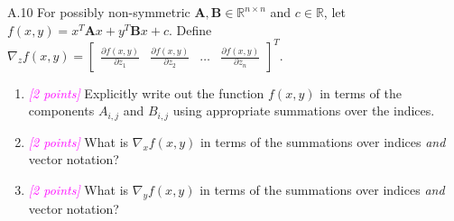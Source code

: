 \documentclass{article}
\newcommand{\field}[1]{\mathbb{#1}}
\newcommand{\1}{\mathbf{1}}
\newcommand{\R}{\field{R}} %
\newcommand{\mat}[1]{\boldsymbol{#1}} %
\newcommand{\points}[1]{\small\textcolor{magenta}{\emph{[#1 points]}} \normalsize}
\begin{document}
A.10 For possibly non-symmetric $\mat{A}, \mat{B} \in \R^{n \times n}$ and $c \in \R$, let $f(x, y) = x^T \mat{A} x + y^T \mat{B} x + c$. Define $\nabla_z f(x,y) = \begin{bmatrix} \frac{\partial f(x,y)}{\partial z_1} & \frac{\partial f(x,y)}{\partial z_2} & \dots & \frac{\partial f(x,y)}{\partial z_n} \end{bmatrix}^T$.  
\begin{enumerate}
	\item \points{2} Explicitly write out the function $f(x, y)$ in terms of the components $A_{i,j}$ and $B_{i,j}$ using appropriate summations over the indices.
	\item \points{2} What is $\nabla_x f(x,y)$ in terms of the summations over indices \emph{and} vector notation?
	\item \points{2} What is $\nabla_y f(x,y)$ in terms of the summations over indices \emph{and} vector notation?
\end{enumerate}
\end{document}
